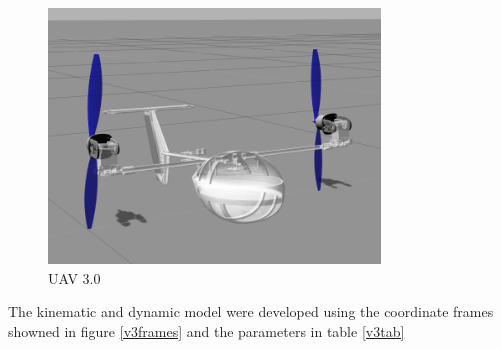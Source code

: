\begin{figure}[!ht]
	\centering
	\includegraphics[width=250pt]{figuras/vant3.png}
	\caption{UAV 3.0}
	\label{vant3}
\end{figure}

The kinematic and dynamic model were developed using the coordinate frames showned in figure \ref{v3frames} and the parameters in table \ref{v3tab}

